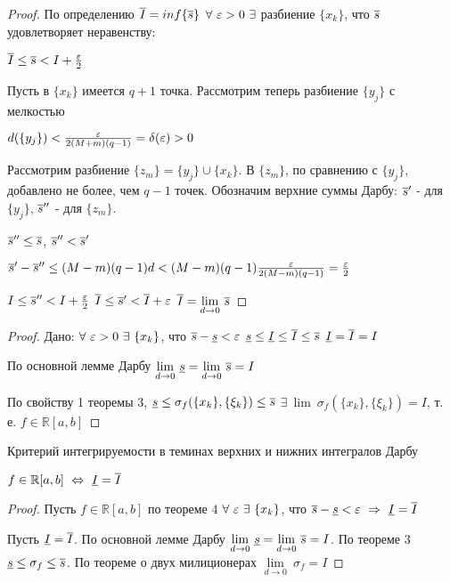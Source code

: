 \begin{proof}
По определению $\overline{I}=inf\{\overline{s}\}$ \then $\forall\ \varepsilon>0\ \exists$ разбиение $\{x_k\}$, что $\overline{s}$ удовлетворяет неравенству:

$\overline{I}\leq\overline{s}<I+\frac{\varepsilon}2$

Пусть в $\{x_k\}$ имеется $q+1$ точка. Рассмотрим теперь разбиение $\{y_j\}$ с мелкостью

$d(\{y_j\})<\frac{\varepsilon}{2(M+m)(q-1)}=\delta(\varepsilon)>0$

Рассмотрим разбиение $\{z_m\}=\{y_j\}\cup\{x_k\}$. В $\{z_m\}$, по сравнению с $\{y_j\}$, добавлено не более, чем $q-1$ точек. Обозначим верхние суммы Дарбу: $\overline{s}'$ - для $\{y_j\}$, $\overline{s}''$ - для $\{z_m\}$.

$\overline{s}''\leq\overline{s}$, $\overline{s}''<\overline{s}'$

$\overline{s}'-\overline{s}''\leq(M-m)(q-1)d<(M-m)(q-1)\frac{\varepsilon}{2(M-m)(q-1)}=\frac{\varepsilon}2$

$I\leq\overline{s}''<I+\frac{\varepsilon}2$ \then $\overline{I}\leq\overline{s}'<\overline{I}+\varepsilon$ \then $\overline{I}=\underset{d\to0}{\lim}\ \overline{s}$
\end{proof}
\begin{proof}

Дано: $\forall\ \eps>0\ \exists\ \{x_k\}$, что $\overline{s}-\underline{s}<\varepsilon$ \then $\underline{s}\leq\underline{I}\leq\overline{I}\leq\overline{s}$ \then $\underline{I}=\overline{I}=I$

По основной лемме Дарбу $\underset{d\to0}{\lim}\ \ns=\underset{d\to0}{\lim}\ \vs=I$

По свойству 1 теоремы 3, $\underline{s}\leq\sigma_f(\{x_k\},\{\xi_k\})\leq\overline{s}$ \then $\exists\ \lim\ \sigma_f(\{x_k\},\{\xi_k\})=I$, т. е. $f\in\mathbb{R}[a,b]$
\end{proof}
\begin{theor}Критерий интегрируемости в теминах верхних и нижних интегралов Дарбу

$f\in\mathbb{R}[a,b]\ \Leftrightarrow\ \nis=\vis$
\end{theor}
\begin{proof}

Пусть $f\in\mathbb{R}[a,b]$ \then по теореме 4 $\forall\ \eps\ \exists\ \{x_k\}$, что $\vs-\ns<\eps\ \Rightarrow\ \nis=\vis$


Пусть $\underline{I}=\overline{I}$. По основной лемме Дарбу $\underset{d\to0}{\lim}\ \ns=\underset{d\to0}{\lim}\ \vs=I$. По теореме 3 $\underline{s}\leq\sigma_f\leq\overline{s}$. По теореме о двух милиционерах $\underset{d\to0}{\lim}\ \sigma_f=I$
\end{proof}
